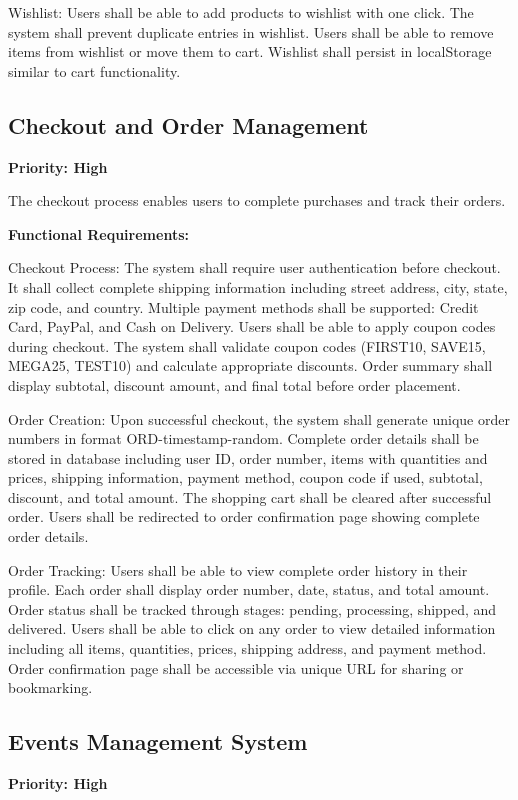 ﻿\documentclass[11pt]{article}
\begin{document}
Wishlist: Users shall be able to add products to wishlist with one click. The system shall prevent duplicate entries in wishlist. Users shall be able to remove items from wishlist or move them to cart. Wishlist shall persist in localStorage similar to cart functionality.

\subsection{Checkout and Order Management}
\textbf{Priority: High}

The checkout process enables users to complete purchases and track their orders.

\textbf{Functional Requirements:}

Checkout Process: The system shall require user authentication before checkout. It shall collect complete shipping information including street address, city, state, zip code, and country. Multiple payment methods shall be supported: Credit Card, PayPal, and Cash on Delivery. Users shall be able to apply coupon codes during checkout. The system shall validate coupon codes (FIRST10, SAVE15, MEGA25, TEST10) and calculate appropriate discounts. Order summary shall display subtotal, discount amount, and final total before order placement.

Order Creation: Upon successful checkout, the system shall generate unique order numbers in format ORD-timestamp-random. Complete order details shall be stored in database including user ID, order number, items with quantities and prices, shipping information, payment method, coupon code if used, subtotal, discount, and total amount. The shopping cart shall be cleared after successful order. Users shall be redirected to order confirmation page showing complete order details.

Order Tracking: Users shall be able to view complete order history in their profile. Each order shall display order number, date, status, and total amount. Order status shall be tracked through stages: pending, processing, shipped, and delivered. Users shall be able to click on any order to view detailed information including all items, quantities, prices, shipping address, and payment method. Order confirmation page shall be accessible via unique URL for sharing or bookmarking.

\subsection{Events Management System}
\textbf{Priority: High}
\end{document}
